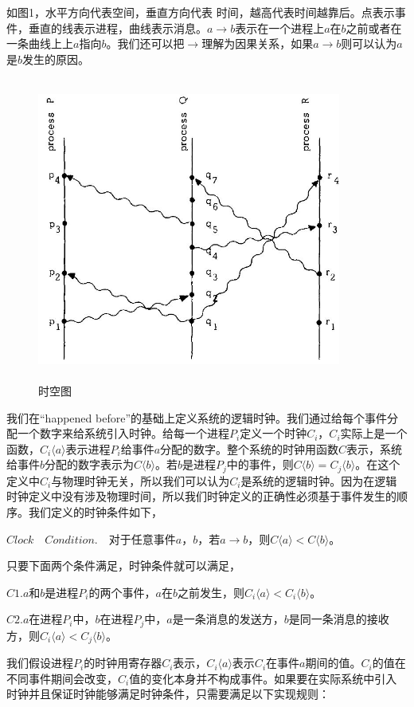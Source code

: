 \documentclass[UTF8]{article}
\begin{document}
	如图1，水平方向代表空间，垂直方向代表	时间，越高代表时间越靠后。点表示事件，垂直的线表示进程，曲线表示消息。$a \to b$表示在一个进程上$a$在$b$之前或者在一条曲线上上$a$指向$b$。我们还可以把$\to$理解为因果关系，如果$a \to b$则可以认为$a$是$b$发生的原因。
\begin{figure}[H]
\centering
\small
\includegraphics[width=10cm,height=10cm]{1.JPG}
\caption{时空图}
\end{figure}
	
	我们在“happened before”的基础上定义系统的逻辑时钟。我们通过给每个事件分配一个数字来给系统引入时钟。给每一个进程$P_i$定义一个时钟$C_i$，$C_i$实际上是一个函数，$C_i \langle a \rangle$表示进程$P_i$给事件$a$分配的数字。整个系统的时钟用函数$C$表示，系统给事件$b$分配的数字表示为$C \langle b \rangle$。若$b$是进程$P_j$中的事件，则$C\langle b\rangle =C_j\langle b\rangle$。在这个定义中$C_i$与物理时钟无关，所以我们可以认为$C_i$是系统的逻辑时钟。因为在逻辑时钟定义中没有涉及物理时间，所以我们时钟定义的正确性必须基于事件发生的顺序。我们定义的时钟条件如下，
	
	$Clock \quad Condition. \quad$对于任意事件$a$，$b$，若$a \to b$，则$C \langle a \rangle < C \langle b \rangle$。
	
	只要下面两个条件满足，时钟条件就可以满足，
	
	$C1$.$a$和$b$是进程$P_i$的两个事件，$a$在$b$之前发生，则$C_i \langle a \rangle < C_i \langle b \rangle$。

	$C2$.$a$在进程$P_i$中，$b$在进程$P_j$中，$a$是一条消息的发送方，$b$是同一条消息的接收方，则$C_i \langle a \rangle < C_j \langle b \rangle$。

	我们假设进程$P_i$的时钟用寄存器$C_i$表示，$C_i \langle a \rangle$表示$C_i$在事件$a$期间的值。$C_i$的值在不同事件期间会改变，$C_i$值的变化本身并不构成事件。如果要在实际系统中引入时钟并且保证时钟能够满足时钟条件，只需要满足以下实现规则：
\end{document}
